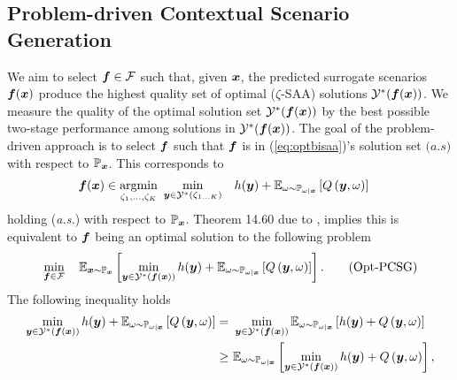 \subsection{Problem-driven Contextual Scenario Generation}\label{subsection:PCSG}

We aim to select $\boldsymbol{f} \in \mathcal{F}$ such that, given $\boldsymbol{x}$, the predicted surrogate scenarios $\boldsymbol{f}(\boldsymbol{x})$ produce the highest quality set of optimal \hbox{($\zeta$-SAA)} solutions $\mathcal{Y}^*(\boldsymbol{f}(\boldsymbol{x}))$. We measure the quality of the optimal solution set $\mathcal{Y}^*(\boldsymbol{f}(\boldsymbol{x}))$ by the best possible two-stage performance among solutions in $\mathcal{Y}^*(\boldsymbol{f}(\boldsymbol{x}))$. The goal of the problem-driven approach is to select $\boldsymbol{f}$ such that $\boldsymbol{f}$ is in (\ref{eq:optbisaa})'s solution set $\textit{(a.s)}$ with respect to $\mathbb{P}_{\boldsymbol{x}}$. This corresponds to 
\begin{equation*}
  \begin{aligned}
\bs{f}(\bs{x}) \in \underset{\zeta_1, ... ,\zeta_K}{\text{argmin}} \ \min_{\bs{y} \in \mathcal{Y}^*(\zeta_{1\hdots K})} \quad  & h( \bs{y}) + \mathbb{E}_{\omega \sim \mathbb{P}_{\omega | \bs{x}}} \left[ Q \left(\bs{y}, \omega \right) \right] 
\end{aligned}
\end{equation*}
holding (\textit{a.s.}) with respect to $\mathbb{P}_{\boldsymbol{x}}$. Theorem 14.60 due to \citet{rockafellar2009variational}, implies this is equivalent to $\boldsymbol{f}$ being an optimal solution to the following problem
\begin{equation} \label{eq:pCSG-opt1}
\min_{\boldsymbol{f} \in \mathcal{F}} \quad  \mathbb{E}_{\boldsymbol{x} \sim \mathbb{P}_{\boldsymbol{x}}} \left[ \min_{\boldsymbol{y} \in \mathcal{Y}^*(\boldsymbol{f}(\boldsymbol{x}))} h(\boldsymbol{y}) + \mathbb{E}_{\omega \sim \mathbb{P}_{\omega | \boldsymbol{x}}} \left[ Q \left(\boldsymbol{y}, \omega \right) \right] \right]. \tag{Opt-PCSG}
\end{equation} 
The following inequality holds
\begin{align} 
\min_{\boldsymbol{y} \in \mathcal{Y}^*(\boldsymbol{f}(\boldsymbol{x}))} h(\boldsymbol{y}) + \mathbb{E}_{\omega \sim \mathbb{P}_{\omega | \boldsymbol{x}}} \left[ Q \left(\boldsymbol{y}, \omega \right) \right]
= \ & \min_{\boldsymbol{y} \in \mathcal{Y}^*(\boldsymbol{f}(\boldsymbol{x}))} \mathbb{E}_{\omega \sim \mathbb{P}_{\omega | \boldsymbol{x}}} \left[ h(\boldsymbol{y}) + Q \left(\boldsymbol{y}, \omega \right) \right] \nonumber \\ \nonumber
\geq \ &  \mathbb{E}_{\omega \sim \mathbb{P}_{\omega | \boldsymbol{x}}} \left[ \min_{\boldsymbol{y} \in \mathcal{Y}^*(\boldsymbol{f}(\boldsymbol{x}))} h(\boldsymbol{y}) + Q \left(\boldsymbol{y}, \omega \right) \right],
\end{align}
